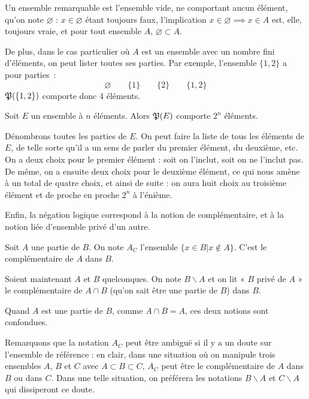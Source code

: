 Un ensemble remarquable est l'ensemble vide, ne comportant aucun élément, qu'on note $\varnothing$ : $x\in\varnothing$ étant toujours faux, l'implication $x\in\varnothing \implies x\in A$ est, elle, toujours vraie, et pour tout ensemble $A$, $\varnothing \subset A$.  

De plus, dans le cas particulier où $A$ est un ensemble avec un nombre fini d'éléments, on peut lister toutes ses parties. Par exemple, l'ensemble $\{1,2\}$ a pour parties~:
\[\varnothing \qquad \{1\} \qquad \{2\} \qquad \{1,2\}\]  
$\mathfrak{P}(\{1,2\})$ comporte donc 4 éléments.

\begin{prop}
    Soit $E$ un ensemble à $n$ éléments. Alors $\mathfrak{P}(E)$ comporte $2^n$ éléments.
\end{prop}
\begin{demo}
    Dénombrons toutes les parties de $E$. On peut faire la liste de tous les éléments de $E$, de telle sorte qu'il a un sens de parler du premier élément, du deuxième, etc. On a deux choix pour le premier élément : soit on l'inclut, soit on ne l'inclut pas. De même, on a ensuite deux choix pour le deuxième élément, ce qui nous amène à un total de quatre choix, et ainsi de suite : on aura huit choix au troisième élément et de proche en proche $2^n$ à l'énième.
\end{demo}

Enfin, la négation logique correspond à la notion de complémentaire, et à la notion liée d'ensemble privé d'un autre.

\begin{defini}
    Soit $A$ une partie de $B$. On note ${A}_C$ l'ensemble $\{x\in B|x\not\in A\}$. C'est le complémentaire de $A$ dans $B$.

\medskip
    Soient maintenant $A$ et $B$ quelconques. On note $B\backslash A$ et on lit « $B$ privé de $A$ » le complémentaire de $A\cap B$ (qu'on sait être une partie de $B$) dans $B$.

\medskip
    Quand $A$ est une partie de $B$, comme $A\cap B = A$, ces deux notions sont confondues.
\end{defini}

Remarquons que la notation $A_C$ peut être ambiguë si il y a un doute sur l'ensemble de référence : en clair, dans une situation où on manipule trois ensembles $A$, $B$ et $C$ avec $A\subset B \subset C$, $A_C$ peut être le complémentaire de $A$ dans $B$ ou dans $C$. Dans une telle situation, on préférera les notations $B\backslash A$ et $C\backslash A$ qui dissiperont ce doute.

